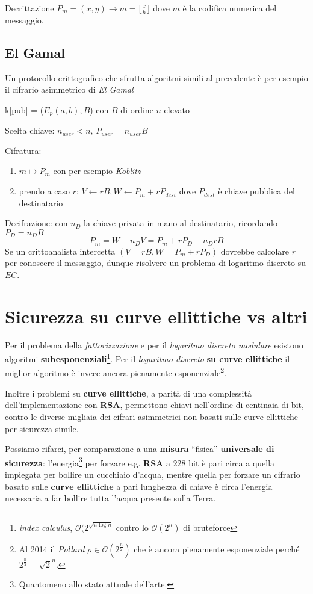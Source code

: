 \documentclass{article}
\begin{document}
Decrittazione $P_m=(x,y)\to m = \lfloor\frac{x}{h}\rfloor$ dove $m$ è la codifica numerica del messaggio.

\subsection{El Gamal}
Un protocollo crittografico che sfrutta algoritmi simili al precedente è per esempio il cifrario asimmetrico di \textit{El Gamal}

k[pub] = ($E_p(a,b),B$) con $B$ di ordine $n$ elevato

Scelta chiave: $n_{user} < n$, $P_{user} = n_{user}B$

Cifratura:
\begin{enumerate}
    \item $m\mapsto P_m$ con per esempio \textit{Koblitz}
    
    \item prendo a caso $r$: $V\leftarrow rB,W\leftarrow P_m+rP_{dest}$ dove $P_{dest}$ è chiave pubblica del destinatario
\end{enumerate}
Decifrazione: con $n_D$ la chiave privata in mano al destinatario,  ricordando $P_D=n_DB$
\[
P_m = W-n_D V=P_m+rP_D-n_DrB
\]
Se un crittoanalista intercetta $(V=rB,W=P_m+rP_D)$ dovrebbe calcolare $r$ per conoscere il messaggio, dunque risolvere un problema di logaritmo discreto su $EC$.

\section{Sicurezza su curve ellittiche vs altri}
Per il problema della \textit{fattorizzazione} e per il \textit{logaritmo discreto modulare} esistono algoritmi \textbf{subesponenziali}\footnote{\textit{index calculus}, $\mathcal{O}(2^{\sqrt{n\log n}}$ contro lo $\mathcal{O}(2^n)$ di bruteforce}.
Per il \textit{logaritmo discreto} \textbf{su curve ellittiche} il miglior algoritmo è invece ancora pienamente esponenziale\footnote{Al 2014 il \textit{Pollard} $\rho\in \mathcal{O}(2^{\frac{n}{2}})$ che è ancora pienamente esponenziale perché $2^{\frac{n}{2}}=\sqrt{2}^n$.}.

Inoltre i problemi su \textbf{curve ellittiche}, a parità di una complessità dell'implementazione con \textbf{RSA}, permettono chiavi nell'ordine di centinaia di bit, contro le diverse migliaia dei cifrari asimmetrici non basati sulle curve ellittiche per sicurezza simile. 

Possiamo rifarci, per comparazione a una \textbf{misura} ``fisica'' \textbf{universale di sicurezza}: l'energia\footnote{Quantomeno allo stato attuale dell'arte.} per forzare e.g. \textbf{RSA} a 228 bit è pari circa a quella impiegata per bollire un cucchiaio d'acqua, mentre quella per forzare un cifrario basato sulle \textbf{curve ellittiche} a pari lunghezza di chiave è circa l'energia necessaria a far bollire tutta l'acqua presente sulla Terra.
\end{document}

